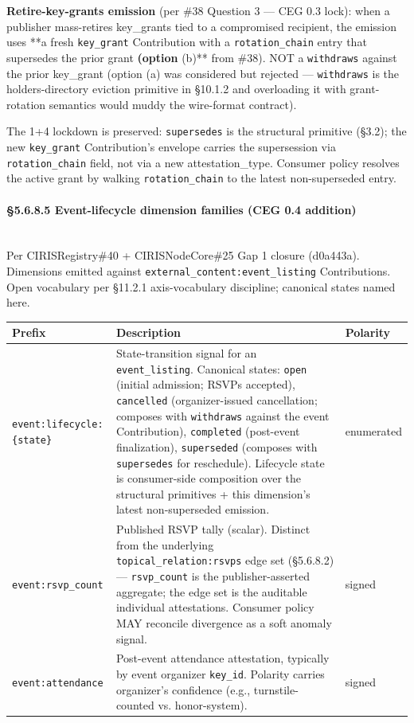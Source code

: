 \documentclass[10pt]{article}
\begin{document}
\textbf{Retire-key-grants emission} (per \#38 Question 3 — CEG 0.3 lock): when a publisher mass-retires key\_grants tied to a compromised recipient, the emission uses **a fresh \texttt{key\_grant} Contribution with a \texttt{rotation\_chain} entry that supersedes the prior grant\textbf{ (option }(b)** from \#38). NOT a \texttt{withdraws} against the prior key\_grant (option (a) was considered but rejected — \texttt{withdraws} is the holders-directory eviction primitive in §10.1.2 and overloading it with grant-rotation semantics would muddy the wire-format contract).


The 1+4 lockdown is preserved: \texttt{supersedes} is the structural primitive (§3.2); the new \texttt{key\_grant} Contribution's envelope carries the supersession via \texttt{rotation\_chain} field, not via a new attestation\_type. Consumer policy resolves the active grant by walking \texttt{rotation\_chain} to the latest non-superseded entry.


\paragraph{§5.6.8.5 Event-lifecycle dimension families (CEG 0.4 addition)}\mbox{}\\


Per CIRISRegistry\#40 + CIRISNodeCore\#25 Gap 1 closure (d0a443a). Dimensions emitted against \texttt{external\_content:event\_listing} Contributions. Open vocabulary per §11.2.1 axis-vocabulary discipline; canonical states named here.


{\footnotesize
\begin{longtable}{|p{5.33cm}|p{5.33cm}|p{5.33cm}|}\hline
\textbf{Prefix} & \textbf{Description} & \textbf{Polarity} \\ \hline\endhead
\texttt{event:lifecycle:\{state\}} & State-transition signal for an \texttt{event\_listing}. Canonical states: \texttt{open} (initial admission; RSVPs accepted), \texttt{cancelled} (organizer-issued cancellation; composes with \texttt{withdraws} against the event Contribution), \texttt{completed} (post-event finalization), \texttt{superseded} (composes with \texttt{supersedes} for reschedule). Lifecycle state is consumer-side composition over the structural primitives + this dimension's latest non-superseded emission. & enumerated \\ \hline
\texttt{event:rsvp\_count} & Published RSVP tally (scalar). Distinct from the underlying \texttt{topical\_relation:rsvps} edge set (§5.6.8.2) — \texttt{rsvp\_count} is the publisher-asserted aggregate; the edge set is the auditable individual attestations. Consumer policy MAY reconcile divergence as a soft anomaly signal. & signed \\ \hline
\texttt{event:attendance} & Post-event attendance attestation, typically by event organizer \texttt{key\_id}. Polarity carries organizer's confidence (e.g., turnstile-counted vs. honor-system). & signed \\ \hline
\end{longtable}}
\end{document}
